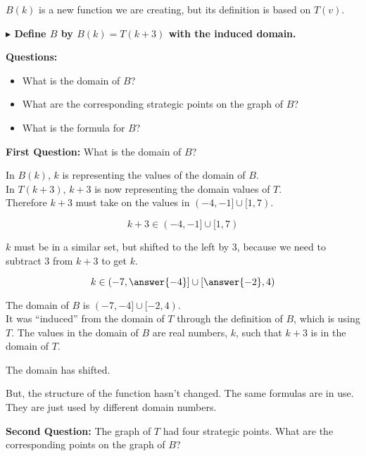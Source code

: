 \documentclass{ximera}
\begin{document}
$B(k)$ is a new function we are creating, but its definition is based on $T(v)$.


\textbf{\textcolor{blue!55!black}{$\blacktriangleright$ Define $B$ by $B(k) = T(k+3)$ with the induced domain.}} 



\textbf{Questions:} 
\begin{itemize}
  \item What is the domain of $B$?
  \item What are the corresponding strategic points on the graph of $B$?
  \item What is the formula for $B$?
\end{itemize}



\textbf{\textcolor{purple!85!blue}{First Question:}}   What is the domain of $B$?


\begin{explanation}

In $B(k)$, $k$ is representing the values of the domain of $B$. \\
In $T(k + 3)$,  $k+3$ is now representing the domain values of $T$.  \\
Therefore $k+3$ must take on the values in $(-4,-1] \cup [1,7)$.

\[     k+3 \in      (-4,-1] \cup [1,7)     \]


$k$ must be in a similar set, but shifted to the left by $3$, because we need to subtract $3$ from $k+3$ to get $k$.


\[     k \in      \left( -7,\answer{-4} \right] \cup \left[ \answer{-2},4 \right)     \]


The domain of $B$ is $(-7,-4] \cup [-2,4)$.   \\

It was ``induced'' from the domain of $T$ through the definition of $B$, which is using $T$.  The values in the domain of $B$ are real numbers, $k$, such that $k+3$ is in the domain of $T$.

The domain has shifted. 


But, the structure of the function hasn't changed.  The same formulas are in use.  They are just used by different domain numbers.



\end{explanation}




\textbf{\textcolor{purple!85!blue}{Second Question:}}  The graph of $T$ had four strategic points.  What are the corresponding points on the graph of $B$?
\end{document}
